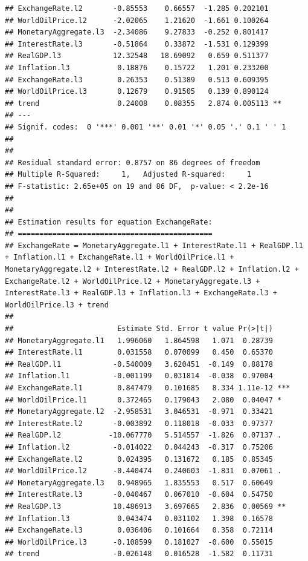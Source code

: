 \documentclass[11pt,preprint, authoryear]{elsarticle}
\numberwithin{equation}{section}
\numberwithin{figure}{section}
\numberwithin{table}{section}
\begin{document}
\begin{verbatim}
## ExchangeRate.l2       -0.85553    0.66557  -1.285 0.202101    
## WorldOilPrice.l2      -2.02065    1.21620  -1.661 0.100264    
## MonetaryAggregate.l3  -2.34086    9.27833  -0.252 0.801417    
## InterestRate.l3       -0.51864    0.33872  -1.531 0.129399    
## RealGDP.l3            12.32548   18.69092   0.659 0.511377    
## Inflation.l3           0.18876    0.15722   1.201 0.233200    
## ExchangeRate.l3        0.26353    0.51389   0.513 0.609395    
## WorldOilPrice.l3       0.12679    0.91505   0.139 0.890124    
## trend                  0.24008    0.08355   2.874 0.005113 ** 
## ---
## Signif. codes:  0 '***' 0.001 '**' 0.01 '*' 0.05 '.' 0.1 ' ' 1
## 
## 
## Residual standard error: 0.8757 on 86 degrees of freedom
## Multiple R-Squared:     1,   Adjusted R-squared:     1 
## F-statistic: 2.65e+05 on 19 and 86 DF,  p-value: < 2.2e-16 
## 
## 
## Estimation results for equation ExchangeRate: 
## ============================================= 
## ExchangeRate = MonetaryAggregate.l1 + InterestRate.l1 + RealGDP.l1 + Inflation.l1 + ExchangeRate.l1 + WorldOilPrice.l1 + MonetaryAggregate.l2 + InterestRate.l2 + RealGDP.l2 + Inflation.l2 + ExchangeRate.l2 + WorldOilPrice.l2 + MonetaryAggregate.l3 + InterestRate.l3 + RealGDP.l3 + Inflation.l3 + ExchangeRate.l3 + WorldOilPrice.l3 + trend 
## 
##                        Estimate Std. Error t value Pr(>|t|)    
## MonetaryAggregate.l1   1.996060   1.864598   1.071  0.28739    
## InterestRate.l1        0.031558   0.070099   0.450  0.65370    
## RealGDP.l1            -0.540009   3.620451  -0.149  0.88178    
## Inflation.l1          -0.001199   0.031814  -0.038  0.97004    
## ExchangeRate.l1        0.847479   0.101685   8.334 1.11e-12 ***
## WorldOilPrice.l1       0.372465   0.179043   2.080  0.04047 *  
## MonetaryAggregate.l2  -2.958531   3.046531  -0.971  0.33421    
## InterestRate.l2       -0.003892   0.118018  -0.033  0.97377    
## RealGDP.l2           -10.067770   5.514557  -1.826  0.07137 .  
## Inflation.l2          -0.014022   0.044243  -0.317  0.75206    
## ExchangeRate.l2        0.024395   0.131672   0.185  0.85345    
## WorldOilPrice.l2      -0.440474   0.240603  -1.831  0.07061 .  
## MonetaryAggregate.l3   0.948965   1.835553   0.517  0.60649    
## InterestRate.l3       -0.040467   0.067010  -0.604  0.54750    
## RealGDP.l3            10.486913   3.697665   2.836  0.00569 ** 
## Inflation.l3           0.043474   0.031102   1.398  0.16578    
## ExchangeRate.l3        0.036406   0.101664   0.358  0.72114    
## WorldOilPrice.l3      -0.108599   0.181027  -0.600  0.55015    
## trend                 -0.026148   0.016528  -1.582  0.11731    

\end{verbatim}
\end{document}
